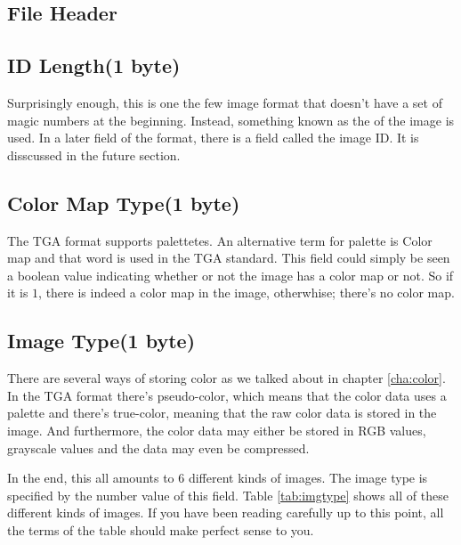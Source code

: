 \begin{refsection}
  \newcommand{\plural}[3]{\ifstrequal{#1}{1}{#2}{#3}}

  \newcommand{\fieldlength}[1]{\ifstrequal{#1}{0}{variable}{#1 \plural{#1}{byte}{bytes}}}

  \newcommand{\imgfield}[2]{\subsection*{#1(\fieldlength{#2})}}

  \section{File Header}

  \imgfield{ID Length}{1}

  Surprisingly enough, this is one the few image format that doesn't
  have a set of magic numbers at the beginning. Instead, something
  known as the of the image is used. In a later field of
  the format, there is a field called the image ID. It is disscussed
  in the future section.

  \imgfield{Color Map Type}{1}

  The TGA format supports palettetes. An alternative term for palette
  is Color map and that word is used in the TGA
  standard. This field could simply be seen a boolean value indicating
  whether or not the image has a color map or not. So if it is $1$,
  there is indeed a color map in the image, otherwhise; there's no
  color map.

  \imgfield{Image Type}{1}

  There are several ways of storing color as we talked about in
  chapter \ref{cha:color}. In the TGA format there's
  pseudo-color, which means that the color data
  uses a palette and there's true-color, meaning that the raw
  color data is stored in the image. And furthermore, the color data
  may either be stored in RGB values, grayscale values and the data
  may even be compressed.

  In the end, this all amounts to $6$ different kinds of images. The
  image type is specified by the number value of this field. Table \ref{tab:imgtype}
  shows all of these different kinds of images. If you have been
  reading carefully up to this point, all the terms of the table
  should make perfect sense to you.


\end{refsection}
